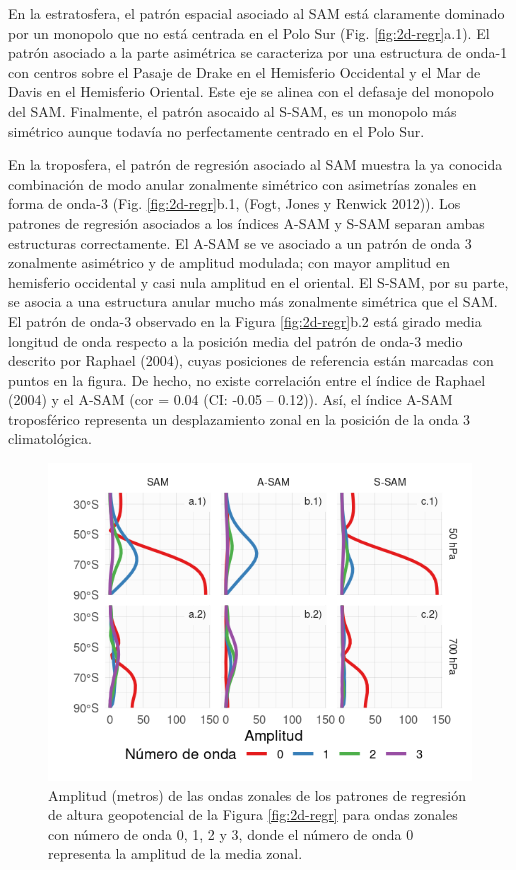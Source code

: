 \documentclass[12pt,oneside,a4paper]{reedthesis}
\begin{document}
En la estratosfera, el patrón espacial asociado al SAM está claramente dominado por un monopolo que no está centrada en el Polo Sur (Fig. \ref{fig:2d-regr}a.1).
El patrón asociado a la parte asimétrica se caracteriza por una estructura de onda-1 con centros sobre el Pasaje de Drake en el Hemisferio Occidental y el Mar de Davis en el Hemisferio Oriental.
Este eje se alinea con el defasaje del monopolo del SAM.
Finalmente, el patrón asocaido al S-SAM, es un monopolo más simétrico aunque todavía no perfectamente centrado en el Polo Sur.

En la troposfera, el patrón de regresión asociado al SAM muestra la ya conocida combinación de modo anular zonalmente simétrico con asimetrías zonales en forma de onda-3 (Fig. \ref{fig:2d-regr}b.1, (Fogt, Jones y Renwick 2012)).
Los patrones de regresión asociados a los índices A-SAM y S-SAM separan ambas estructuras correctamente.
El A-SAM se ve asociado a un patrón de onda 3 zonalmente asimétrico y de amplitud modulada; con mayor amplitud en hemisferio occidental y casi nula amplitud en el oriental.
El S-SAM, por su parte, se asocia a una estructura anular mucho más zonalmente simétrica que el SAM.
El patrón de onda-3 observado en la Figura \ref{fig:2d-regr}b.2 está girado media longitud de onda respecto a la posición media del patrón de onda-3 medio descrito por Raphael (2004), cuyas posiciones de referencia están marcadas con puntos en la figura.
De hecho, no existe correlación entre el índice de Raphael (2004) y el A-SAM (cor = 0.04 (CI: -0.05 -- 0.12)).
Así, el índice A-SAM troposférico representa un desplazamiento zonal en la posición de la onda 3 climatológica.



\begin{figure}

{\centering \includegraphics{figures/30-sam/wave-amplitude-1} 

}

\caption{Amplitud (metros) de las ondas zonales de los patrones de regresión de altura geopotencial de la Figura \ref{fig:2d-regr} para ondas zonales con número de onda 0, 1, 2 y 3, donde el número de onda 0 representa la amplitud de la media zonal.}\label{fig:wave-amplitude}
\end{figure}
\end{document}

